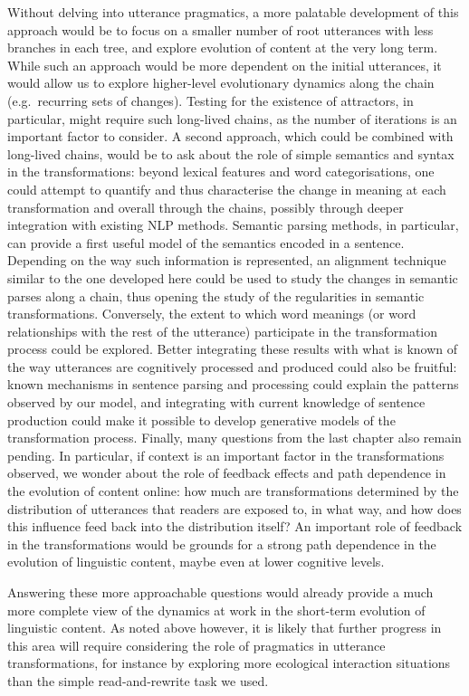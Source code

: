 Without delving into utterance pragmatics, a more palatable development
of this approach would be to focus on a smaller number of root
utterances with less branches in each tree, and explore evolution of
content at the very long term. While such an approach would be more
dependent on the initial utterances, it would allow us to explore
higher-level evolutionary dynamics along the chain (e.g.~recurring sets
of changes). Testing for the existence of attractors, in particular,
might require such long-lived chains, as the number of iterations is an
important factor to consider. A second approach, which could be combined
with long-lived chains, would be to ask about the role of simple
semantics and syntax in the transformations: beyond lexical features and
word categorisations, one could attempt to quantify and thus
characterise the change in meaning at each transformation and overall
through the chains, possibly through deeper integration with existing
NLP methods. Semantic parsing methods, in particular, can provide a
first useful model of the semantics encoded in a sentence. Depending on
the way such information is represented, an alignment technique similar
to the one developed here could be used to study the changes in semantic
parses along a chain, thus opening the study of the regularities in
semantic transformations. Conversely, the extent to which word meanings
(or word relationships with the rest of the utterance) participate in
the transformation process could be explored. Better integrating these
results with what is known of the way utterances are cognitively
processed and produced could also be fruitful: known mechanisms in
sentence parsing and processing could explain the patterns observed by
our model, and integrating with current knowledge of sentence production
could make it possible to develop generative models of the
transformation process. Finally, many questions from the last chapter
also remain pending. In particular, if context is an important factor in
the transformations observed, we wonder about the role of feedback
effects and path dependence in the evolution of content online: how much
are transformations determined by the distribution of utterances that
readers are exposed to, in what way, and how does this influence feed
back into the distribution itself? An important role of feedback in the
transformations would be grounds for a strong path dependence in the
evolution of linguistic content, maybe even at lower cognitive levels.

Answering these more approachable questions would already provide a much
more complete view of the dynamics at work in the short-term evolution
of linguistic content. As noted above however, it is likely that further
progress in this area will require considering the role of pragmatics in
utterance transformations, for instance by exploring more ecological
interaction situations than the simple read-and-rewrite task we used.

